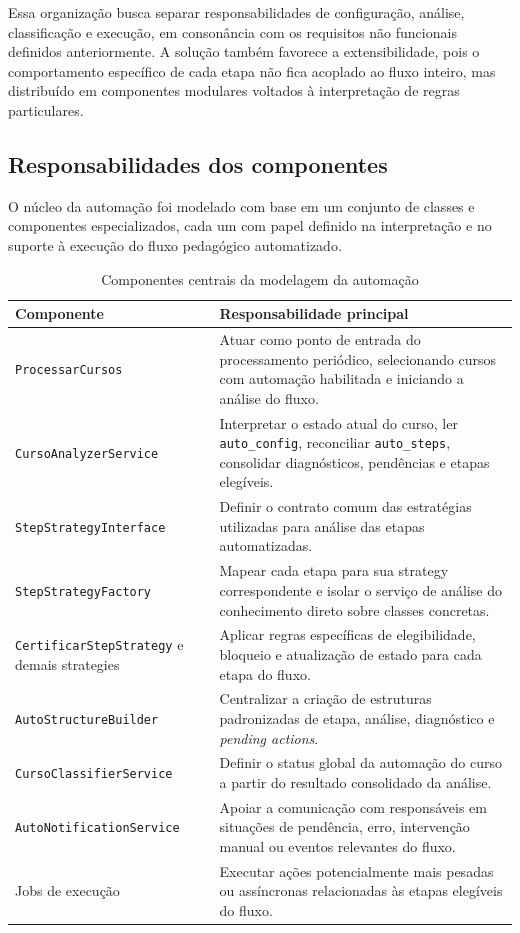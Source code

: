 Essa organização busca separar responsabilidades de configuração,
análise, classificação e execução, em consonância com os requisitos não
funcionais definidos anteriormente. A solução também favorece a
extensibilidade, pois o comportamento específico de cada etapa não fica
acoplado ao fluxo inteiro, mas distribuído em componentes modulares
voltados à interpretação de regras particulares.

\subsection{Responsabilidades dos componentes}
\label{sec:metod:modelagem:componentes}

O núcleo da automação foi modelado com base em um conjunto de classes e
componentes especializados, cada um com papel definido na interpretação
e no suporte à execução do fluxo pedagógico automatizado.

\begin{table}[H]
\centering
\caption{Componentes centrais da modelagem da automação}
\label{tab:componentes-modelagem-automacao}
\begin{tabular}{p{4.5cm} p{8.5cm}}
\hline
\textbf{Componente} & \textbf{Responsabilidade principal} \\
\hline
\texttt{ProcessarCursos} & Atuar como ponto de entrada do processamento periódico, selecionando cursos com automação habilitada e iniciando a análise do fluxo. \\
\hline
\texttt{CursoAnalyzerService} & Interpretar o estado atual do curso, ler \texttt{auto\_config}, reconciliar \texttt{auto\_steps}, consolidar diagnósticos, pendências e etapas elegíveis. \\
\hline
\texttt{StepStrategyInterface} & Definir o contrato comum das estratégias utilizadas para análise das etapas automatizadas. \\
\hline
\texttt{StepStrategyFactory} & Mapear cada etapa para sua strategy correspondente e isolar o serviço de análise do conhecimento direto sobre classes concretas. \\
\hline
\texttt{CertificarStepStrategy} e demais strategies & Aplicar regras específicas de elegibilidade, bloqueio e atualização de estado para cada etapa do fluxo. \\
\hline
\texttt{AutoStructureBuilder} & Centralizar a criação de estruturas padronizadas de etapa, análise, diagnóstico e \textit{pending actions}. \\
\hline
\texttt{CursoClassifierService} & Definir o status global da automação do curso a partir do resultado consolidado da análise. \\
\hline
\texttt{AutoNotificationService} &   Apoiar a comunicação com responsáveis em situações de pendência, erro, intervenção manual ou eventos relevantes do fluxo. \\
\hline
Jobs de execução & Executar ações potencialmente mais pesadas ou assíncronas relacionadas às etapas elegíveis do fluxo. \\
\hline
\end{tabular}
\end{table}

